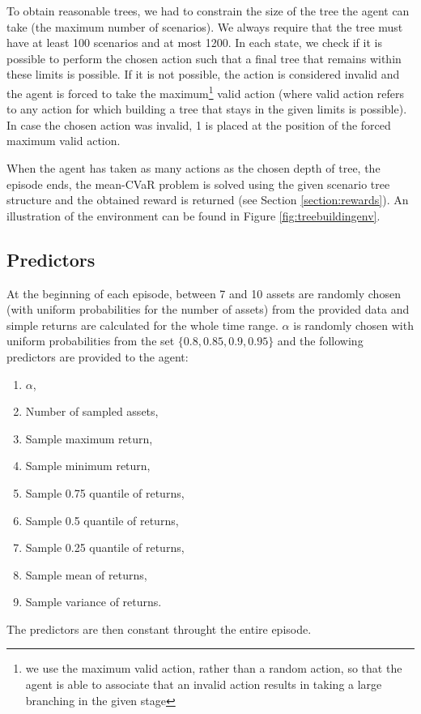 To obtain reasonable trees, we had to constrain the size of the tree the agent can take (the maximum number of scenarios). We always require that the tree must have at least 100 scenarios and at most 1200. In each state, we check if it is possible to perform the chosen action such that a final tree that remains within these limits is possible. If it is not possible, the action is considered invalid and the agent is forced to take the maximum\footnote{we use the maximum valid action, rather than a random action, so that the agent is able to associate that an invalid action results in taking a large branching in the given stage} valid action (where valid action refers to any action for which building a tree that stays in the given limits is possible). In case the chosen action was invalid, 1 is placed at the position of the forced maximum valid action.

When the agent has taken as many actions as the chosen depth of tree, the episode ends, the mean-CVaR problem is solved using the given scenario tree structure and the obtained reward is returned (see Section \ref{section:rewards}). An illustration of the environment can be found in Figure \ref{fig:treebuildingenv}.

\subsection{Predictors}
\label{subsection:predictors}
At the beginning of each episode, between 7 and 10 assets are randomly chosen (with uniform probabilities for the number of assets) from the provided data and simple returns are calculated for the whole time range. $\alpha$ is randomly chosen with uniform probabilities from the set $\{0.8, 0.85, 0.9, 0.95\}$ and the following predictors are provided to the agent:
\begin{enumerate}
\item $\alpha$,
\item Number of sampled assets,
\item Sample maximum return,
\item Sample minimum return,
\item Sample 0.75 quantile of returns,
\item Sample 0.5 quantile of returns,
\item Sample 0.25 quantile of returns,
\item Sample mean of returns,
\item Sample variance of returns.
\end{enumerate}
The predictors are then constant throught the entire episode.

